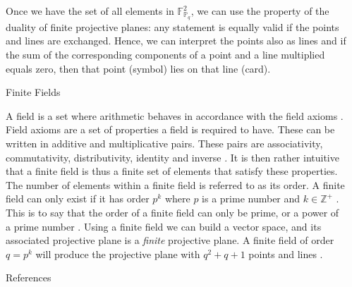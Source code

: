 \documentclass[final]{beamer}
\newlength{\sepwidth}
\newlength{\colwidth}
\newcommand{\separatorcolumn}{\begin{column}{\sepwidth}\end{column}}
\begin{document}
\begin{frame}[t]
\begin{columns}[t]
\begin{column}{\colwidth}
\begin{exampleblock}{}
    Once we have the set of all elements in $\mathbb{F}^2_{\mathbb{P}_q}$, we can use the property of the duality of finite projective planes: any statement is equally valid if the points and lines are exchanged. Hence, we can interpret the points also as lines and if the sum of the corresponding components of a point and a line multiplied equals zero, then that point (symbol) lies on that line (card).

  \end{exampleblock}

  \begin{block}{Finite Fields}

      A field is a set where arithmetic behaves in accordance with the field axioms \cite{Weisstein2023b}. Field axioms are a set of properties a field is required to have. These can be written in additive and multiplicative pairs. These pairs are associativity, commutativity, distributivity, identity and inverse \cite{Weisstein2023}. It is then rather intuitive that a finite field is thus a finite set of elements that satisfy these properties. The number of elements within a finite field is referred to as its order. A finite field can only exist if it has order $p^k$ where $p$ is a prime number and $k\in\mathbb{Z}^+$ \cite{cameron2000}. This is to say that the order of a finite field can only be prime, or a power of a prime number \cite{cameron2000}. Using a finite field we can build a vector space, and its associated projective plane is a \emph{finite} projective plane. A finite field of order $q=p^k$ will produce the projective plane with $q^2+q+1$ points and lines \cite{Collingridge2018}.

  \end{block}
 
  \begin{block}{References}
    \vspace{-0.25em}
\footnotesize{}
  \end{block}

\end{column}

\separatorcolumn
\end{columns}
\end{frame}
\end{document}
